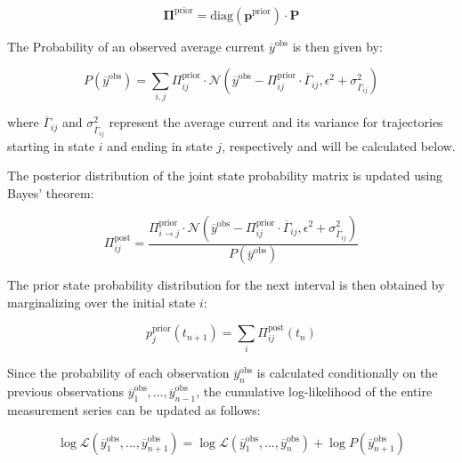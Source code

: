 \documentclass[pdflatex,sn-mathphys-num]{sn-jnl}%
\theoremstyle{thmstyleone}%
\theoremstyle{thmstyletwo}%
\theoremstyle{thmstylethree}%
\begin{document}
\begin{equation}
	\boldsymbol{\Pi}^{\text{prior}} = \text{diag}(\boldsymbol{p}^{\text{prior}}) \cdot \mathbf{P}
	\label{eq:joint_state_probability_matrix}
\end{equation}

The Probability of an observed average current \( \overline{y}^{\text{obs}} \) is then given by:

\begin{equation}
	P(\overline{y}^{\text{obs}}) = \sum_{i,j} \Pi_{ij}^{\text{prior}} \cdot \mathcal{N}\left(\overline{y}^{\text{obs}} - \Pi_{ij}^{\text{prior}} \cdot \overline{\Gamma}_{ij}, \epsilon^2 + \sigma^2_{\overline{\Gamma}_{ij}}\right)
\end{equation}

where \( \overline{\Gamma}_{ij} \) and \( \sigma^2_{\overline{\Gamma}_{ij}} \) represent the average current and its variance for trajectories starting in state \( i \) and ending in state \( j \), respectively and will be calculated below. 

The posterior distribution of the joint state probability matrix is updated using Bayes' theorem:

\begin{equation}
	\Pi_{ij}^{\text{post}} = \frac{\Pi_{i \rightarrow j}^{\text{prior}} \cdot \mathcal{N}\left(\overline{y}^{\text{obs}} - \Pi_{ij}^{\text{prior}} \cdot \overline{\Gamma}_{ij}, \epsilon^2 + \sigma^2_{\overline{\Gamma}_{ij}}\right)}{P(\overline{y}^{\text{obs}})}
\end{equation}

The prior state probability distribution for the next interval is then obtained by marginalizing over the initial state \( i \):

\begin{equation}
	p_j^{\text{prior}}(t_{n+1}) = \sum_i \Pi_{ij}^{\text{post}}(t_n)
\end{equation}

Since the probability of each observation \( \overline{y}_n^{\text{obs}} \) is calculated conditionally on the previous observations \( \overline{y}_1^{\text{obs}}, \dots, \overline{y}_{n-1}^{\text{obs}} \), the cumulative log-likelihood of the entire measurement series can be updated as follows:

\begin{equation}
	\log \mathcal{L}(\overline{y}_1^{\text{obs}}, \dots, \overline{y}_{n+1}^{\text{obs}}) = \log \mathcal{L}(\overline{y}_1^{\text{obs}}, \dots, \overline{y}_n^{\text{obs}}) + \log P(\overline{y}_{n+1}^{\text{obs}})
\end{equation}
\end{document}

